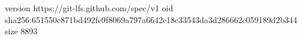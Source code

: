 version https://git-lfs.github.com/spec/v1
oid sha256:651550c871bd492fe9f8069a797a6642e18c33543da3d286662c059189d2b344
size 8893
